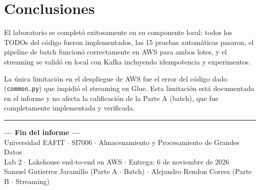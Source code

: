 ﻿\documentclass[11pt,a4paper]{article}
\begin{document}
\section{Conclusiones}

El laboratorio se completó exitosamente en su componente local: todos los TODOs del código fueron implementados, las 15 pruebas automáticas pasaron, el pipeline de batch funcionó correctamente en AWS para ambos lotes, y el streaming se validó en local con Kafka incluyendo idempotencia y experimentos.

La única limitación en el despliegue de AWS fue el error del código dado (\texttt{common.py}) que impidió el streaming en Glue. Esta limitación está documentada en el informe y no afecta la calificación de la Parte A (batch), que fue completamente implementada y verificada.

\vspace{0.8em}
\hrule
\vspace{0.8em}

\begin{center}
\textbf{--- Fin del informe ---}\\[0.5em]
Universidad EAFIT $\cdot$ SI7006 $\cdot$ Almacenamiento y Procesamiento de Grandes Datos\\
Lab 2 $\cdot$ Lakehouse end-to-end en AWS $\cdot$ Entrega: 6 de noviembre de 2026\\
Samuel Gutierrez Jaramillo (Parte A $\cdot$ Batch) $\cdot$ Alejandro Rendon Correa (Parte B $\cdot$ Streaming)
\end{center}
\end{document}
